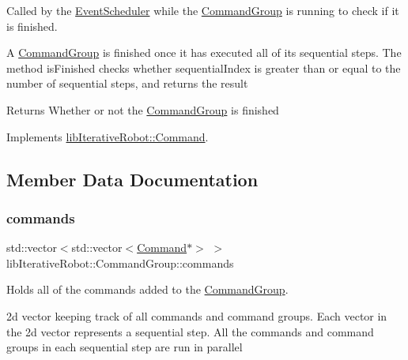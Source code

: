 Called by the \mbox{\hyperlink{classlib_iterative_robot_1_1_event_scheduler}{Event\+Scheduler}} while the \mbox{\hyperlink{classlib_iterative_robot_1_1_command_group}{Command\+Group}} is running to check if it is finished. 

A \mbox{\hyperlink{classlib_iterative_robot_1_1_command_group}{Command\+Group}} is finished once it has executed all of its sequential steps. The method is\+Finished checks whether sequential\+Index is greater than or equal to the number of sequential steps, and returns the result

\begin{DoxyReturn}{Returns}
Whether or not the \mbox{\hyperlink{classlib_iterative_robot_1_1_command_group}{Command\+Group}} is finished 
\end{DoxyReturn}


Implements \mbox{\hyperlink{classlib_iterative_robot_1_1_command_a8e4dccdd88f432a716090f532ba097f7}{lib\+Iterative\+Robot\+::\+Command}}.



\subsection{Member Data Documentation}
\mbox{\label{classlib_iterative_robot_1_1_command_group_aa7a293ed14071e183070e00580ccbecf}} 
\subsubsection{\texorpdfstring{commands}{commands}}
{\footnotesize\ttfamily std\+::vector$<$std\+::vector$<$\mbox{\hyperlink{classlib_iterative_robot_1_1_command}{Command}}$\ast$$>$ $>$ lib\+Iterative\+Robot\+::\+Command\+Group\+::commands\hspace{0.3cm}{\ttfamily [private]}}



Holds all of the commands added to the \mbox{\hyperlink{classlib_iterative_robot_1_1_command_group}{Command\+Group}}. 

2d vector keeping track of all commands and command groups. Each vector in the 2d vector represents a sequential step. All the commands and command groups in each sequential step are run in parallel \mbox{\label{classlib_iterative_robot_1_1_command_group_ad804d6ab2feaec9e95dde18706548a89}} 
